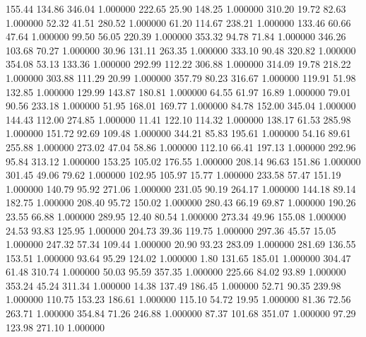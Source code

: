    155.44    134.86    346.04  1.000000
    222.65     25.90    148.25  1.000000
    310.20     19.72     82.63  1.000000
     52.32     41.51    280.52  1.000000
     61.20    114.67    238.21  1.000000
    133.46     60.66     47.64  1.000000
     99.50     56.05    220.39  1.000000
    353.32     94.78     71.84  1.000000
    346.26    103.68     70.27  1.000000
     30.96    131.11    263.35  1.000000
    333.10     90.48    320.82  1.000000
    354.08     53.13    133.36  1.000000
    292.99    112.22    306.88  1.000000
    314.09     19.78    218.22  1.000000
    303.88    111.29     20.99  1.000000
    357.79     80.23    316.67  1.000000
    119.91     51.98    132.85  1.000000
    129.99    143.87    180.81  1.000000
     64.55     61.97     16.89  1.000000
     79.01     90.56    233.18  1.000000
     51.95    168.01    169.77  1.000000
     84.78    152.00    345.04  1.000000
    144.43    112.00    274.85  1.000000
     11.41    122.10    114.32  1.000000
    138.17     61.53    285.98  1.000000
    151.72     92.69    109.48  1.000000
    344.21     85.83    195.61  1.000000
     54.16     89.61    255.88  1.000000
    273.02     47.04     58.86  1.000000
    112.10     66.41    197.13  1.000000
    292.96     95.84    313.12  1.000000
    153.25    105.02    176.55  1.000000
    208.14     96.63    151.86  1.000000
    301.45     49.06     79.62  1.000000
    102.95    105.97     15.77  1.000000
    233.58     57.47    151.19  1.000000
    140.79     95.92    271.06  1.000000
    231.05     90.19    264.17  1.000000
    144.18     89.14    182.75  1.000000
    208.40     95.72    150.02  1.000000
    280.43     66.19     69.87  1.000000
    190.26     23.55     66.88  1.000000
    289.95     12.40     80.54  1.000000
    273.34     49.96    155.08  1.000000
     24.53     93.83    125.95  1.000000
    204.73     39.36    119.75  1.000000
    297.36     45.57     15.05  1.000000
    247.32     57.34    109.44  1.000000
     20.90     93.23    283.09  1.000000
    281.69    136.55    153.51  1.000000
     93.64     95.29    124.02  1.000000
      1.80    131.65    185.01  1.000000
    304.47     61.48    310.74  1.000000
     50.03     95.59    357.35  1.000000
    225.66     84.02     93.89  1.000000
    353.24     45.24    311.34  1.000000
     14.38    137.49    186.45  1.000000
     52.71     90.35    239.98  1.000000
    110.75    153.23    186.61  1.000000
    115.10     54.72     19.95  1.000000
     81.36     72.56    263.71  1.000000
    354.84     71.26    246.88  1.000000
     87.37    101.68    351.07  1.000000
     97.29    123.98    271.10  1.000000
